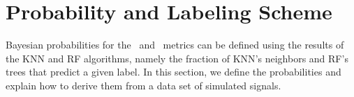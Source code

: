 \section{Probability and Labeling Scheme} \label{probability}

Bayesian probabilities for the \hasns\ and \hasrem\ metrics can be defined using the results of the \ac{KNN} and \ac{RF} algorithms, namely the fraction of \ac{KNN}'s neighbors and \ac{RF}'s trees that predict a given label. In this section, we define the probabilities and explain how to derive them from a data set of simulated signals.  







